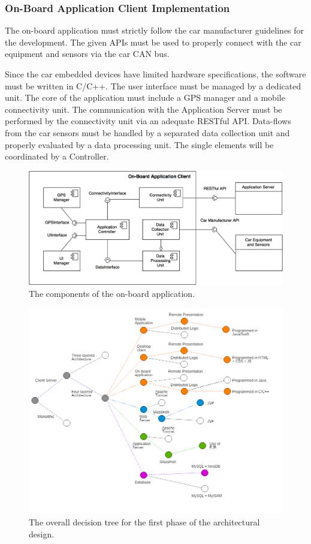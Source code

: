 \subsubsection{On-Board Application Client Implementation}
The on-board application must strictly follow the car manufacturer guidelines for the development. The given APIs must be used to properly connect with the car equipment and sensors via the car CAN bus.

Since the car embedded devices have limited hardware specifications, the software must be written in C/C++. The user interface must be managed by a dedicated unit. The core of the application must include a GPS manager and a mobile connectivity unit. The communication with the Application Server must be performed by the connectivity unit via an adequate RESTful API. Data-flows from the car sensors must be handled by a separated data collection unit and properly evaluated by a data processing unit. The single elements will be coordinated by a Controller.

\begin{figure}[H]
\begin{center}
		\includegraphics[width=\textwidth]{./arch_design/diagrams/on_board_comps.png}
		\caption{The components of the on-board application.}
		\label{on_board_comps}
\end{center}
\end{figure}

\begin{figure}[H]
\begin{center}
		\includegraphics[width=\textwidth]{./arch_design/diagrams/choices_tree.png}
		\caption{The overall decision tree for the first phase of the architectural design.}
		\label{overall_choices}
\end{center}
\end{figure}
